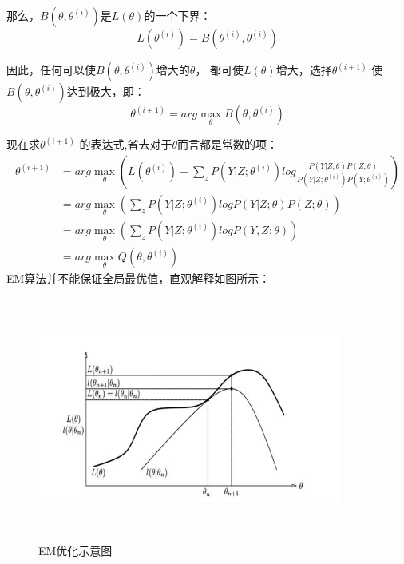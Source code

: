\documentclass[a4paper,12pt]{book}
\begin{document}
    那么，$B(\theta,\theta^{(i)})$是$L(\theta)$的一个下界：
    \begin{equation}
        L(\theta^{(i)}) = B(\theta^{(i)},\theta^{(i)})
    \end{equation}

    因此，任何可以使$B(\theta,\theta^{(i)})$增大的$\theta$，
    都可使$L(\theta)$增大，选择$\theta^{(i+1)}$
    \mbox{使}$B(\theta,\theta^{(i)})$达到极大，即：
    \begin{equation}
        \theta^{(i+1)} = arg \max_{\theta} B(\theta,\theta^{(i)})
    \end{equation}

    现在求$\theta^{(i+1)}$ 的表达式,省去对于$\theta$而言都是常数的项：
    \begin{equation}
        \begin{split}
            \theta^{(i+1)} &= arg\max_{\theta} \left(L(\theta^{(i)})+\sum_{z}P(Y|Z;\theta^{(i)}) log \frac{P(Y|Z; \theta) P(Z; \theta)}{P(Y|Z;\theta^{(i)})P(Y;\theta^{(i)})}\right)\\
            &= arg\max_{\theta} \left(\sum_{z}P(Y|Z;\theta^{(i)}) log{P(Y|Z; \theta) P(Z; \theta)}\right)\\
            &= arg\max_{\theta} \left(\sum_{z}P(Y|Z;\theta^{(i)})log P(Y,Z;\theta)\right)\\
            &= arg\max_{\theta} Q(\theta, \theta^{(i)})
        \end{split}
    \end{equation}
    EM算法并不能保证全局最优值，直观解释如图所示：
    \begin{figure}[h]
        \begin{center}
            \caption{EM优化示意图}
            \includegraphics[width=10cm, height=8cm]{9_1.jpg}
        \end{center}
    \end{figure}
\end{document}
